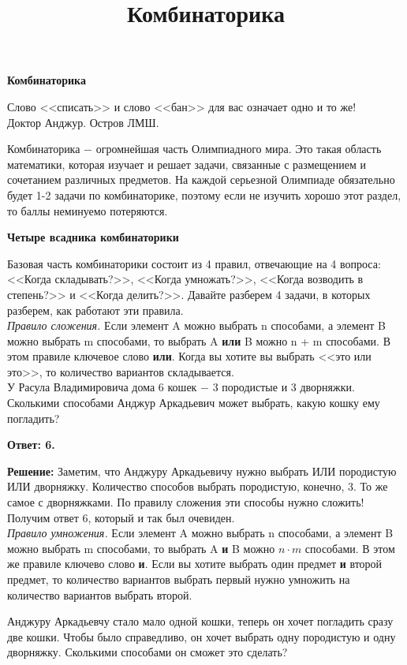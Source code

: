 \centerline{\bf \Huge Комбинаторика}
\title{Комбинаторика}

\begin{flushright}
    \scriptsize Слово <<списать>> и слово <<бан>> для вас означает одно и то же!\\Доктор Анджур. Остров ЛМШ.
\end{flushright}

Комбинаторика $-$ огромнейшая часть Олимпиадного мира. Это такая область математики, которая изучает и решает задачи, связанные с размещением и сочетанием различных предметов. На каждой серьезной Олимпиаде обязательно будет 1-2 задачи по комбинаторике, поэтому если не изучить хорошо этот раздел, то баллы неминуемо потеряются.

\textbf{\Large Четыре всадника комбинаторики}

Базовая часть комбинаторики состоит из 4 правил, отвечающие на 4 вопроса: <<Когда складывать?>>, <<Когда умножать?>>, <<Когда возводить в степень?>> и <<Когда делить?>>. Давайте разберем 4 задачи, в которых разберем, как работают эти правила.\\

\textit{Правило сложения.} Если элемент A можно выбрать n способами, а элемент B можно выбрать m способами, то выбрать A \textbf{или} B можно n + m способами. В этом правиле ключевое слово \textbf{или}. Когда вы хотите вы выбрать <<это или это>>, то количество вариантов складывается.\\


У Расула Владимировича дома 6 кошек $-$ 3 породистые и 3 дворняжки. Сколькими способами Анджур Аркадьевич может выбрать, какую кошку ему погладить?

\textbf{Ответ: 6.}

\textbf{Решение:} Заметим, что Анджуру Аркадьевичу нужно выбрать ИЛИ породистую ИЛИ дворняжку. Количество способов выбрать породистую, конечно, 3. То же самое с дворняжками. По правилу сложения эти способы нужно сложить! Получим ответ 6, который и так был очевиден.\\

\textit{Правило умножения.} Если элемент A можно выбрать n способами, а элемент B можно выбрать m способами, то выбрать A \textbf{и} B можно $n\cdot m$ способами. В этом же правиле ключево слово \textbf{и}. Если вы хотите выбрать один предмет \textbf{и} второй предмет, то количество вариантов выбрать первый нужно умножить на количество вариантов выбрать второй.
\newpage

 Анджуру Аркадьевчу стало мало одной кошки, теперь он хочет погладить сразу две кошки. Чтобы было справедливо, он хочет выбрать одну породистую и одну дворняжку. Сколькими способами он сможет это сделать?


